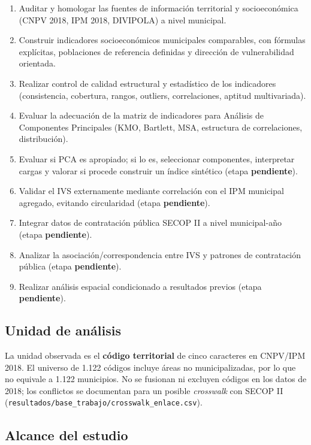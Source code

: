 \begin{enumerate}
    \item Auditar y homologar las fuentes de información territorial y socioeconómica (CNPV 2018, IPM 2018, DIVIPOLA) a nivel municipal.
    \item Construir indicadores socioeconómicos municipales comparables, con fórmulas explícitas, poblaciones de referencia definidas y dirección de vulnerabilidad orientada.
    \item Realizar control de calidad estructural y estadístico de los indicadores (consistencia, cobertura, rangos, outliers, correlaciones, aptitud multivariada).
    \item Evaluar la adecuación de la matriz de indicadores para Análisis de Componentes Principales (KMO, Bartlett, MSA, estructura de correlaciones, distribución).
    \item Evaluar si PCA es apropiado; si lo es, seleccionar componentes, interpretar cargas y valorar si procede construir un índice sintético (etapa \textbf{pendiente}).
    \item Validar el IVS externamente mediante correlación con el IPM municipal agregado, evitando circularidad (etapa \textbf{pendiente}).
    \item Integrar datos de contratación pública SECOP II a nivel municipal-año (etapa \textbf{pendiente}).
    \item Analizar la asociación/correspondencia entre IVS y patrones de contratación pública (etapa \textbf{pendiente}).
    \item Realizar análisis espacial condicionado a resultados previos (etapa \textbf{pendiente}).
\end{enumerate}

\subsection{Unidad de análisis}
\label{sec:unidad_analisis_met}

La unidad observada es el \textbf{código territorial} de cinco caracteres en CNPV/IPM 2018. El universo de 1.122 códigos incluye áreas no municipalizadas, por lo que no equivale a 1.122 municipios. No se fusionan ni excluyen códigos en los datos de 2018; los conflictos se documentan para un posible \textit{crosswalk} con SECOP II (\texttt{resultados/base\_trabajo/crosswalk\_enlace.csv}).

\subsection{Alcance del estudio}
\label{sec:alcance}

